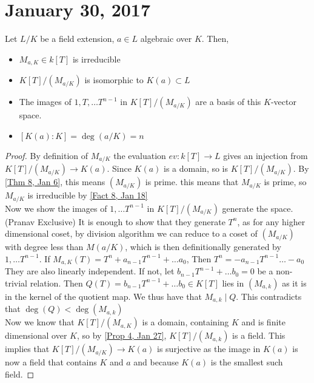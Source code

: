 \section{January 30, 2017}
\begin{prop} \label{Prop 1, Jan 30}
    Let $L / K$ be a field extension, $a \in L$ algebraic over $K$. Then,
    \begin{itemize}
        \item $M_{a,K} \in k[T]$ is irreducible
        \item $K[T] / (M_{a/K})$ is isomorphic to $K(a) \subset L$
        \item The images of $1, T, \dots T^{n-1}$ in $K[T] / (M_{a/K})$ are a
        basis of this $K$-vector space.
        \item $[K(a) : K] = \deg(a/K) = n$
    \end{itemize}
\end{prop}
\begin{proof}
    By definition of $M_{a/K}$ the evaluation $ev: k[T] \rightarrow L$ gives an
    injection from $K[T] / (M_{a/K}) \rightarrow K(a)$. Since $K(a)$ is a domain,
    so is $K[T] / (M_{a/K})$. By \ref{Thm 8, Jan 6}, this means $(M_{a/K})$ is prime.
    this means that $M_{a/K}$ is prime, so $M_{a/K}$ is irreducible by \ref{Fact 8, Jan 18} \\
    Now we show the images of $1, \dots T^{n-1}$ in $K[T] / (M_{a/K})$ generate the space.
    (Pranav Exclusive) It is enough to show that they generate $T^n$, as for any higher
    dimensional coset, by division algorithm we can reduce to a coset of $(M_{a/K})$ with
    degree less than $M(a/K)$, which is then definitionally generated by $1, \dots T^{n-1}$.
    If $M_{a,K}(T) = T^n + a_{n-1}T^{n-1} + \dots a_0$, Then $T^n = -a_{n-1}T^{n-1} \dots -a_0$
    They are also linearly independent. If not, let $b_{n-1}T^{n-1} + \dots b_0 = 0$
    be a non-trivial relation. Then $Q(T) = b_{n-1}T^{n-1} + \dots b_0 \in K[T]$ lies
    in $(M_{a,k})$ as it is in the kernel of the quotient map. We thus have that
    $M_{a,k} \mid Q$. This contradicts that $\deg(Q) < \deg(M_{a,k})$ \\
    Now we know that $K[T] / (M_{a,K})$ is a domain, containing $K$ and is finite
    dimensional over $K$, so by \ref{Prop 4, Jan 27}, $K[T] / (M_{a,k})$ is a field.
    This implies that $K[T] / (M_{a/K}) \rightarrow K(a)$ is surjective as the image
    in $K(a)$ is now a field that contains $K$ and $a$ and because $K(a)$ is the smallest
    such field.
\end{proof}

